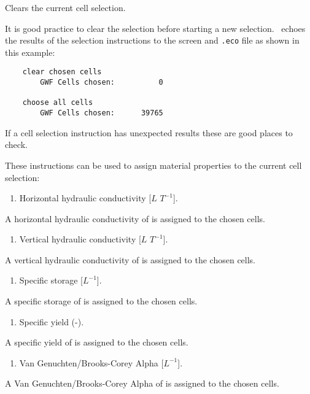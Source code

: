 {
    {Clears the current cell selection.
     }

It is good practice to clear the selection before starting a new selection. \mut\ echoes the results of the selection instructions to the screen and \texttt{.eco} file as shown in this example:
\begin{verbatim}
    clear chosen cells
    	GWF Cells chosen:          0

    choose all cells
    	GWF Cells chosen:      39765
\end{verbatim}
If a cell selection instruction has unexpected results these are good places to check.

\pagebreak
These instructions can be used to assign material properties to the current cell selection:

    {
        \squish
        \begin{enumerate}
        \item {}  Horizontal hydraulic conductivity [$L$   $T^{-1}$].
        \end{enumerate}
          A horizontal hydraulic conductivity of  is assigned to the chosen cells.
    }


    {
        \squish
        \begin{enumerate}
        \item {}  Vertical hydraulic conductivity [$L$   $T^{-1}$].
        \end{enumerate}
          A vertical hydraulic conductivity of  is assigned to the chosen cells.
    }

    {
        \squish
        \begin{enumerate}
        \item {}  Specific storage [$L^{-1}$].
        \end{enumerate}
          A specific storage of  is assigned to the chosen cells.
    }

    {
        \squish
        \begin{enumerate}
        \item {}  Specific yield (-).
        \end{enumerate}
          A specific yield of   is assigned to the chosen cells.
    }

    {
        \squish
        \begin{enumerate}
        \item {}  Van Genuchten/Brooks-Corey Alpha [$L^{-1}$].
        \end{enumerate}
          A Van Genuchten/Brooks-Corey Alpha of  is assigned to the chosen cells.
    }

}
